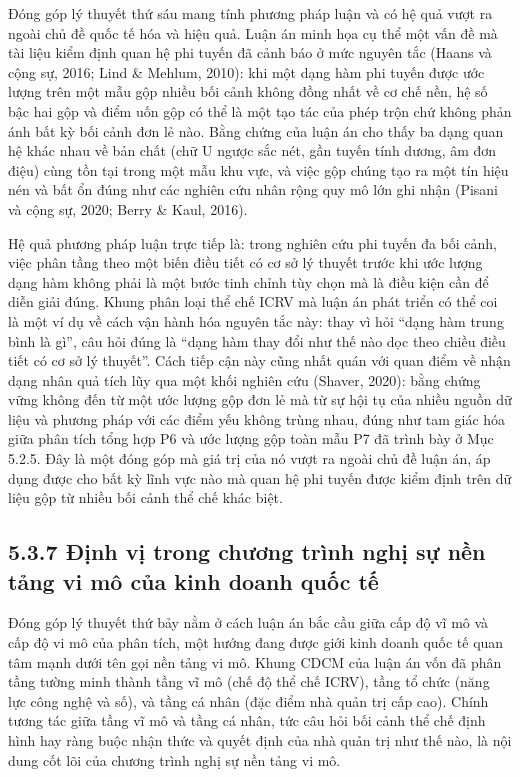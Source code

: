 \documentclass[
  a4paper,
  13pt]{extreport}
\begin{document}
Đóng góp lý thuyết thứ sáu mang tính phương pháp luận và có hệ quả vượt
ra ngoài chủ đề quốc tế hóa và hiệu quả. Luận án minh họa cụ thể một vấn
đề mà tài liệu kiểm định quan hệ phi tuyến đã cảnh báo ở mức nguyên tắc
(Haans và cộng sự, 2016; Lind \& Mehlum, 2010): khi một dạng hàm phi
tuyến được ước lượng trên một mẫu gộp nhiều bối cảnh không đồng nhất về
cơ chế nền, hệ số bậc hai gộp và điểm uốn gộp có thể là một tạo tác của
phép trộn chứ không phản ánh bất kỳ bối cảnh đơn lẻ nào. Bằng chứng của
luận án cho thấy ba dạng quan hệ khác nhau về bản chất (chữ U ngược sắc
nét, gần tuyến tính dương, âm đơn điệu) cùng tồn tại trong một mẫu khu
vực, và việc gộp chúng tạo ra một tín hiệu nén và bất ổn đúng như các
nghiên cứu nhân rộng quy mô lớn ghi nhận (Pisani và cộng sự, 2020; Berry
\& Kaul, 2016).

Hệ quả phương pháp luận trực tiếp là: trong nghiên cứu phi tuyến đa bối
cảnh, việc phân tầng theo một biến điều tiết có cơ sở lý thuyết trước
khi ước lượng dạng hàm không phải là một bước tinh chỉnh tùy chọn mà là
điều kiện cần để diễn giải đúng. Khung phân loại thể chế ICRV mà luận án
phát triển có thể coi là một ví dụ về cách vận hành hóa nguyên tắc này:
thay vì hỏi ``dạng hàm trung bình là gì'', câu hỏi đúng là ``dạng hàm
thay đổi như thế nào dọc theo chiều điều tiết có cơ sở lý thuyết''. Cách
tiếp cận này cũng nhất quán với quan điểm về nhận dạng nhân quả tích lũy
qua một khối nghiên cứu (Shaver, 2020): bằng chứng vững không đến từ một
ước lượng gộp đơn lẻ mà từ sự hội tụ của nhiều nguồn dữ liệu và phương
pháp với các điểm yếu không trùng nhau, đúng như tam giác hóa giữa phân
tích tổng hợp P6 và ước lượng gộp toàn mẫu P7 đã trình bày ở Mục 5.2.5.
Đây là một đóng góp mà giá trị của nó vượt ra ngoài chủ đề luận án, áp
dụng được cho bất kỳ lĩnh vực nào mà quan hệ phi tuyến được kiểm định
trên dữ liệu gộp từ nhiều bối cảnh thể chế khác biệt.

\hypertarget{ux111ux1ecbnh-vux1ecb-trong-chux1b0ux1a1ng-truxecnh-nghux1ecb-sux1ef1-nux1ec1n-tux1ea3ng-vi-muxf4-cux1ee7a-kinh-doanh-quux1ed1c-tux1ebf}{%
\subsection{5.3.7 Định vị trong chương trình nghị sự nền tảng vi mô của
kinh doanh quốc
tế}\label{ux111ux1ecbnh-vux1ecb-trong-chux1b0ux1a1ng-truxecnh-nghux1ecb-sux1ef1-nux1ec1n-tux1ea3ng-vi-muxf4-cux1ee7a-kinh-doanh-quux1ed1c-tux1ebf}}

Đóng góp lý thuyết thứ bảy nằm ở cách luận án bắc cầu giữa cấp độ vĩ mô
và cấp độ vi mô của phân tích, một hướng đang được giới kinh doanh quốc
tế quan tâm mạnh dưới tên gọi nền tảng vi mô. Khung CDCM của luận án vốn
đã phân tầng tường minh thành tầng vĩ mô (chế độ thể chế ICRV), tầng tổ
chức (năng lực công nghệ và số), và tầng cá nhân (đặc điểm nhà quản trị
cấp cao). Chính tương tác giữa tầng vĩ mô và tầng cá nhân, tức câu hỏi
bối cảnh thể chế định hình hay ràng buộc nhận thức và quyết định của nhà
quản trị như thế nào, là nội dung cốt lõi của chương trình nghị sự nền
tảng vi mô.
\end{document}

